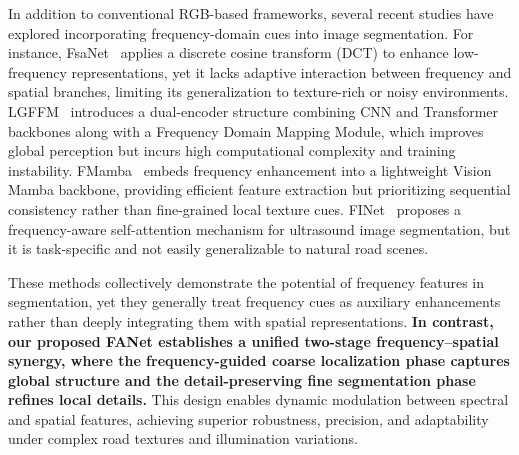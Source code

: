 \documentclass[journal]{IEEEtran}
\begin{document}
In addition to conventional RGB-based frameworks, several recent studies have explored incorporating frequency-domain cues into image segmentation. 
For instance, FsaNet~\cite{DBLP:journals/tip/ZhangPG23} applies a discrete cosine transform (DCT) to enhance low-frequency representations, 
yet it lacks adaptive interaction between frequency and spatial branches, limiting its generalization to texture-rich or noisy environments. 
LGFFM~\cite{11129883TMI} introduces a dual-encoder structure combining CNN and Transformer backbones along with a Frequency Domain Mapping Module, 
which improves global perception but incurs high computational complexity and training instability. 
FMamba~\cite{DBLP:journals/tim/LiuLLWZS25} embeds frequency enhancement into a lightweight Vision Mamba backbone, 
providing efficient feature extraction but prioritizing sequential consistency rather than fine-grained local texture cues. 
FINet~\cite{DBLP:journals/tcsv/WangZZGY25} proposes a frequency-aware self-attention mechanism for ultrasound image segmentation, 
but it is task-specific and not easily generalizable to natural road scenes.




These methods collectively demonstrate the potential of frequency features in segmentation, 
yet they generally treat frequency cues as auxiliary enhancements rather than deeply integrating them with spatial representations. 
\textbf{In contrast, our proposed FANet establishes a unified two-stage frequency–spatial synergy, 
where the frequency-guided coarse localization phase captures global structure and the detail-preserving fine segmentation phase refines local details.} 
This design enables dynamic modulation between spectral and spatial features, achieving superior robustness, precision, and adaptability under complex road textures and illumination variations.
\end{document}

